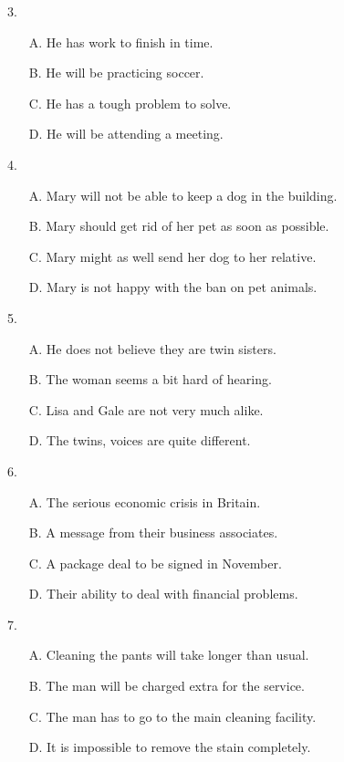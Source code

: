 \documentclass[UTF8,11pt]{ctexart}
\begin{document}
3.


\begin{itemize}[leftmargin=2em,itemsep=.2em,topsep=.4em]\item[A.] He has work to finish in time.
\item[B.] He will be practicing soccer.
\item[C.] He has a tough problem to solve.
\item[D.] He will be attending a meeting.
\end{itemize}

4.


\begin{itemize}[leftmargin=2em,itemsep=.2em,topsep=.4em]\item[A.] Mary will not be able to keep a dog in the building.
\item[B.] Mary should get rid of her pet as soon as possible.
\item[C.] Mary might as well send her dog to her relative.
\item[D.] Mary is not happy with the ban on pet animals.
\end{itemize}

5.


\begin{itemize}[leftmargin=2em,itemsep=.2em,topsep=.4em]\item[A.] He does not believe they are twin sisters.
\item[B.] The woman seems a bit hard of hearing.
\item[C.] Lisa and Gale are not very much alike.
\item[D.] The twins, voices are quite different.
\end{itemize}

6.


\begin{itemize}[leftmargin=2em,itemsep=.2em,topsep=.4em]\item[A.] The serious economic crisis in Britain.
\item[B.] A message from their business associates.
\item[C.] A package deal to be signed in November.
\item[D.] Their ability to deal with financial problems.
\end{itemize}

7.


\begin{itemize}[leftmargin=2em,itemsep=.2em,topsep=.4em]\item[A.] Cleaning the pants will take longer than usual.
\item[B.] The man will be charged extra for the service.
\item[C.] The man has to go to the main cleaning facility.
\item[D.] It is impossible to remove the stain completely.
\end{itemize}
\end{document}
